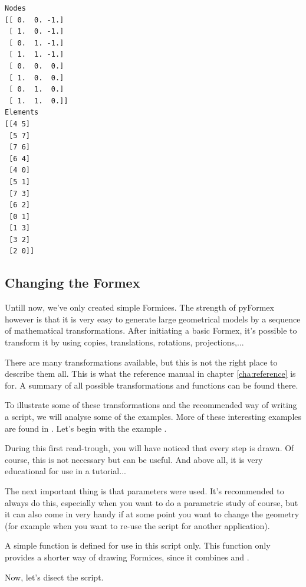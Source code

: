 \documentclass[a4paper]{manual}
\newcommand{\pyformex}{pyFormex\xspace}
\begin{document}
{\begin{verbatim}
Nodes
[[ 0.  0. -1.]
 [ 1.  0. -1.]
 [ 0.  1. -1.]
 [ 1.  1. -1.]
 [ 0.  0.  0.]
 [ 1.  0.  0.]
 [ 0.  1.  0.]
 [ 1.  1.  0.]]
Elements
[[4 5]
 [5 7]
 [7 6]
 [6 4]
 [4 0]
 [5 1]
 [7 3]
 [6 2]
 [0 1]
 [1 3]
 [3 2]
 [2 0]]
\end{verbatim}

\subsection{Changing the Formex}
\label{subsec:changing}
Untill now, we've only created simple Formices. The strength of \pyformex however is that it is very easy to generate large geometrical models by a sequence of mathematical transformations. After initiating a basic Formex, it's possible to transform it by using copies, translations, rotations, projections,...

There are many transformations available, but this is not the right place to describe them all. This is what the reference manual in chapter \ref{cha:reference} is for. A summary of all possible transformations and functions can be found there.

To illustrate some of these transformations and the recommended way of writing a script, we will analyse some of the examples. More of these interesting examples are found in . Let's begin with the example . 



During this first read-trough, you will have noticed that every step is drawn. Of course, this is not necessary but can be useful. And above all, it is very educational for use in a tutorial...

The next important thing is that parameters were used. It's recommended to always do this, especially when you want to do a parametric study of course, but it can also come in very handy if at some point you want to change the geometry (for example when you want to re-use the script for another application).

A simple function  is defined for use in this script only. This function only provides a shorter way of drawing Formices, since it combines  and . 

Now, let's disect the script.%
}
\end{document}
